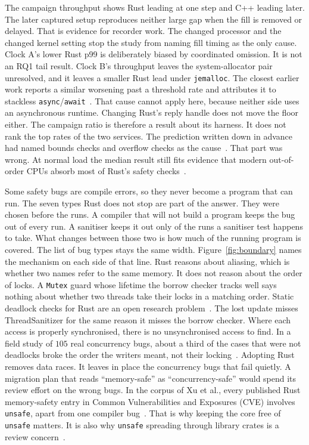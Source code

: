 \documentclass[english,oneside,a4paper,censored,csm,software-track-2020]{HYthesisML}
\begin{document}
The campaign throughput shows Rust leading at one step and C++ leading later.
The later captured setup reproduces neither large gap when the fill is removed or delayed.
That is evidence for recorder work.
The changed processor and the changed kernel setting stop the study from naming fill timing as the only cause.
Clock A's lower Rust p99 is deliberately biased by coordinated omission. It is not an RQ1 tail result.
Clock B's throughput leaves the system-allocator pair unresolved, and it leaves a smaller Rust lead under \texttt{jemalloc}.
The closest earlier work reports a similar worsening past a threshold rate and attributes it to stackless \texttt{async}/\texttt{await}~\cite{arvidsson2025async}.
That cause cannot apply here, because neither side uses an asynchronous runtime.
Changing Rust's reply handle does not move the floor either.
The campaign ratio is therefore a result about its harness. It does not rank the top rates of the two services.
The prediction written down in advance had named bounds checks and overflow checks as the cause~\cite{zhang2022runtime,harris2023morello}.
That part was wrong.
At normal load the median result still fits evidence that modern out-of-order CPUs absorb most of Rust's safety checks~\cite{balasubramanian2017rust,emmerich2019drivers}.

Some safety bugs are compile errors, so they never become a program that can run.
The seven types Rust does not stop are part of the answer. They were chosen before the runs.
A compiler that will not build a program keeps the bug out of every run.
A sanitiser keeps it out only of the runs a sanitiser test happens to take.
What changes between those two is how much of the running program is covered. The list of bug types stays the same width.
Figure~\ref{fig:boundary} names the mechanism on each side of that line.
Rust reasons about aliasing, which is whether two names refer to the same memory. It does not reason about the order of locks.
A \texttt{Mutex} guard whose lifetime the borrow checker tracks well says nothing about whether two threads take their locks in a matching order.
Static deadlock checks for Rust are an open research problem~\cite{zhang2026deadlock}.
The lost update misses ThreadSanitizer for the same reason it misses the borrow checker.
Where each access is properly synchronised, there is no unsynchronised access to find.
In a field study of $105$ real concurrency bugs, about a third of the cases that were not deadlocks broke the order the writers meant, not their locking~\cite{lu2008mistakes}.
Adopting Rust removes data races. It leaves in place the concurrency bugs that fail quietly.
A migration plan that reads ``memory-safe'' as ``concurrency-safe'' would spend its review effort on the wrong bugs.
In the corpus of Xu et al., every published Rust memory-safety entry in Common Vulnerabilities and Exposures (CVE) involves \texttt{unsafe}, apart from one compiler bug~\cite{xu2021rustcve}.
That is why keeping the core free of \texttt{unsafe} matters.
It is also why \texttt{unsafe} spreading through library crates is a review concern~\cite{evans2020rust}.
\end{document}
